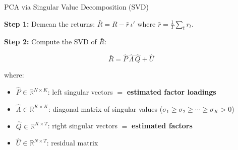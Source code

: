 \documentclass[aspectratio=169]{beamer}
\newcommand{\R}{\mathbb{R}}
\begin{document}
\begin{frame}{PCA via Singular Value Decomposition (SVD)}

\textbf{Step 1:} Demean the returns: $\bar{R} = R - \bar{r}\,\iota'$ where $\bar{r} = \frac{1}{T}\sum_t r_t$.

\vspace{0.5em}
\textbf{Step 2:} Compute the SVD of $\bar{R}$:

$$
\bar{R} = \hat{P}\,\hat{\Lambda}\,\hat{Q} + \hat{U}
$$

\vspace{0.3em}
where:
\begin{itemize}
    \item $\hat{P} \in \R^{N \times K}$: left singular vectors $=$ \textbf{estimated factor loadings}
    \item $\hat{\Lambda} \in \R^{K \times K}$: diagonal matrix of singular values ($\sigma_1 \geq \sigma_2 \geq \cdots \geq \sigma_K > 0$)
    \item $\hat{Q} \in \R^{K \times T}$: right singular vectors $=$ \textbf{estimated factors}
    \item $\hat{U} \in \R^{N \times T}$: residual matrix
\end{itemize}

\end{frame}
%
%
\end{document}
